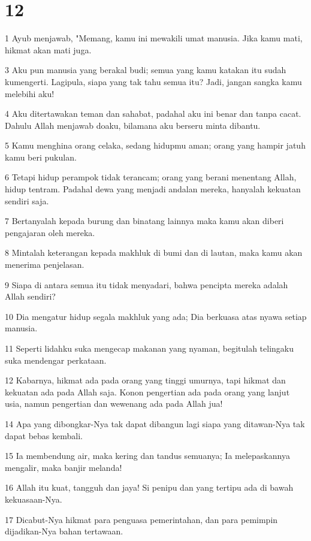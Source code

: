 \chapter{12}

\par 1 Ayub menjawab, "Memang, kamu ini mewakili umat manusia. Jika kamu mati, hikmat akan mati juga.
\par 3 Aku pun manusia yang berakal budi; semua yang kamu katakan itu sudah kumengerti. Lagipula, siapa yang tak tahu semua itu? Jadi, jangan sangka kamu melebihi aku!
\par 4 Aku ditertawakan teman dan sahabat, padahal aku ini benar dan tanpa cacat. Dahulu Allah menjawab doaku, bilamana aku berseru minta dibantu.
\par 5 Kamu menghina orang celaka, sedang hidupmu aman; orang yang hampir jatuh kamu beri pukulan.
\par 6 Tetapi hidup perampok tidak terancam; orang yang berani menentang Allah, hidup tentram. Padahal dewa yang menjadi andalan mereka, hanyalah kekuatan sendiri saja.
\par 7 Bertanyalah kepada burung dan binatang lainnya maka kamu akan diberi pengajaran oleh mereka.
\par 8 Mintalah keterangan kepada makhluk di bumi dan di lautan, maka kamu akan menerima penjelasan.
\par 9 Siapa di antara semua itu tidak menyadari, bahwa pencipta mereka adalah Allah sendiri?
\par 10 Dia mengatur hidup segala makhluk yang ada; Dia berkuasa atas nyawa setiap manusia.
\par 11 Seperti lidahku suka mengecap makanan yang nyaman, begitulah telingaku suka mendengar perkataan.
\par 12 Kabarnya, hikmat ada pada orang yang tinggi umurnya, tapi hikmat dan kekuatan ada pada Allah saja. Konon pengertian ada pada orang yang lanjut usia, namun pengertian dan wewenang ada pada Allah jua!
\par 14 Apa yang dibongkar-Nya tak dapat dibangun lagi siapa yang ditawan-Nya tak dapat bebas kembali.
\par 15 Ia membendung air, maka kering dan tandus semuanya; Ia melepaskannya mengalir, maka banjir melanda!
\par 16 Allah itu kuat, tangguh dan jaya! Si penipu dan yang tertipu ada di bawah kekuasaan-Nya.
\par 17 Dicabut-Nya hikmat para penguasa pemerintahan, dan para pemimpin dijadikan-Nya bahan tertawaan.
